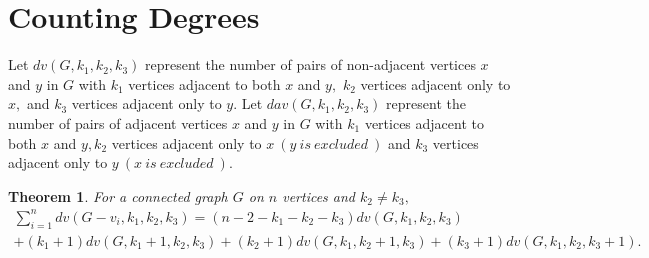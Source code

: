 \documentclass[11pt,oneside]{article}
\newtheorem{thm}{Theorem}
\theoremstyle{definition}
\begin{document}
\section{Counting Degrees}

 \indent \indent Let $dv(G,k_1,k_2,k_3)$ represent the number of pairs of non-adjacent vertices $x$ and $y$ in $G$ with $k_1$ vertices adjacent to both $x$ and $y,$ $k_2$ vertices adjacent only to $x,$ and $k_3$ vertices adjacent only to $y.$ Let $dav(G,k_1,k_2,k_3)$ represent  the number of pairs of adjacent vertices $x$ and $y$ in $G$ with $k_1$ vertices adjacent to both $x$ and $y,k_2$ vertices adjacent only to $x~(y ~ is ~ excluded ~)$ and $k_3$ vertices adjacent only to $y ~(x ~ is ~ excluded ~).$ 


\begin{thm}\label{t3}
For a connected graph $G$ on $n$ vertices and $k_2 \neq k_3,$ 
\begin{multline} 
\sum_{i=1}^{n}{dv(G-v_i,k_1,k_2,k_3)}=(n-2-k_1-k_2-k_3)dv(G,k_1,k_2,k_3)\\+(k_1+1)dv(G,k_1+1,k_2,k_3)
+(k_2+1)dv(G,k_1,k_2+1,k_3)+(k_3+1)dv(G,k_1,k_2,k_3+1). 
\end{multline}
\end{thm}
\end{document}
